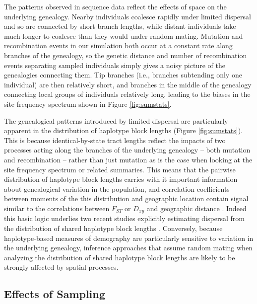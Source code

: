 \documentclass[10pt,twoside,lineno,hidelinks]{preprint}
\begin{document}
The patterns observed in sequence data reflect the effects of space on the underlying genealogy. Nearby individuals coalesce rapidly under limited dispersal and so are connected by short branch lengths, while distant individuals take much longer to coalesce than they would under random mating. 
Mutation and recombination events in our simulation both occur at a constant rate along branches of the genealogy, 
so the genetic distance and number of recombination events separating sampled individuals simply gives a noisy picture of the genealogies connecting them. 
Tip branches (i.e., branches subtending only one individual) are then relatively short, and branches in the middle of the genealogy connecting local groups of individuals relatively long, leading to the biases in the site frequency spectrum shown in Figure \ref{fig:sumstats}. 

The genealogical patterns introduced by limited dispersal are particularly apparent in the distribution of haplotype block lengths (Figure \ref{fig:sumstats}). This is because identical-by-state tract lengths reflect the impacts of two processes acting along the branches of the underlying genealogy -- both mutation and recombination -- rather than just mutation as is the case when looking at the site frequency spectrum or related summaries. This means that the pairwise distribution of haplotype block lengths carries with it important information about genealogical variation in the population, and correlation coefficients between moments of the this distribution and geographic location contain signal similar to the correlations between $F_{ST}$ or $D_{xy}$ and geographic distance \citep{Rousset1997}. Indeed this basic logic underlies two recent studies explicitly estimating dispersal from the distribution of shared haplotype block lengths \citep{Ringbauer2017,Baharian2016}. Conversely, because haplotype-based measures of demography are particularly sensitive to variation in the underlying genealogy, inference approaches that assume random mating when analyzing the distribution of shared haplotype block lengths are likely to be strongly affected by spatial processes. 

\subsection{Effects of Sampling}
\end{document}
